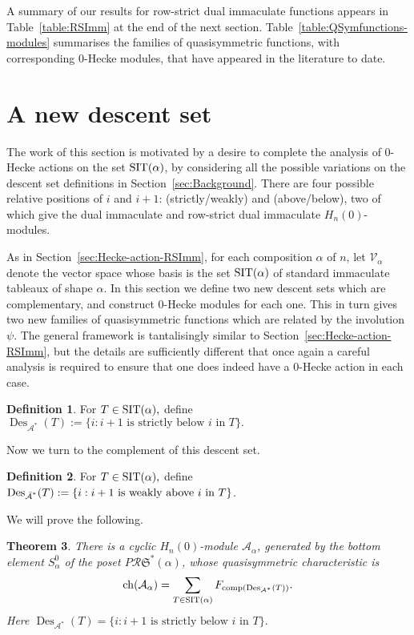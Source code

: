 \documentclass[12pt,letterpaper]{amsart}
\newtheorem{theorem}{Theorem}[section]
\theoremstyle{definition}
\newtheorem{definition}[theorem]{Definition}
\DeclareMathOperator{\comp}{comp}
\newcommand{\rdI}{\mathcal{R}\mathfrak{S}^*}
\DeclareMathOperator{\Des}{Des}
\newcommand{\hn}{H_n(0)}
\begin{document}
A summary of our results for row-strict dual immaculate functions appears in Table~\ref{table:RSImm} at the end of the next section.  Table~\ref{table:QSymfunctions-modules} summarises the families of quasisymmetric functions, with corresponding  $0$-Hecke modules, that have appeared in the literature to date.

\section{A new descent set}\label{sec:new-descent-set}
The work of this section is motivated by a desire to complete the analysis of 0-Hecke actions on the set $\operatorname{SIT}(\alpha)$, by considering all the possible variations on the descent set definitions in Section~\ref{sec:Background}. There are four possible relative positions of $i$ and $i+1$: (strictly/weakly) and  (above/below), two of which give the dual immaculate and row-strict dual immaculate $\hn$-modules. 

As in Section~\ref{sec:Hecke-action-RSImm}, for each composition $\alpha$ of $n$, let $\mathcal{V}_\alpha$ denote the vector space whose basis is the set $\operatorname{SIT}(\alpha)$ of standard immaculate tableaux of shape $\alpha$.  In this section we define two new descent sets which are complementary, and construct 0-Hecke modules for each one.  This in turn gives two new families of quasisymmetric functions which are related by the involution $\psi$. The general framework is tantalisingly  similar to  Section~\ref{sec:Hecke-action-RSImm}, but the details are sufficiently different that once again a  careful analysis is required to ensure that one does indeed have a 0-Hecke action in each case.



\begin{definition}\label{def:new-des}  For $T\in\operatorname{SIT}(\alpha),$ define $\Des_{\mathcal{A}^*}(T):=\{i: i+1 \text{ is strictly below $i$ in $T$}\}.$
\end{definition}

Now we turn to the complement of this descent set.  

\begin{definition}\label{def:new-des-complement}  For $T\in\operatorname{SIT}(\alpha),$ define $\Des_{\bA^*}(T):=\{i: i+1 \text{ is weakly above $i$ in $T$}\}$.
\end{definition}

We will prove the following.

\begin{theorem}\label{thm:Hecke-module-A} There is a cyclic $\hn$-module $\mathcal{A}_\alpha$, generated by the bottom element  $S^0_\alpha$ of the poset $P\rdI(\alpha)$,  whose quasisymmetric characteristic is
\[ \chr({\mathcal{A}_\alpha})=
\sum_{T\in \SIT(\alpha)} F_{\comp(\Des_{\mathcal{A}^*}(T))}.\]
Here $\Des_{\mathcal{A}^*}(T)=\{i: i+1 \text{ is strictly below  } i \text{ in }T\}.$
\end{theorem}
\end{document}
